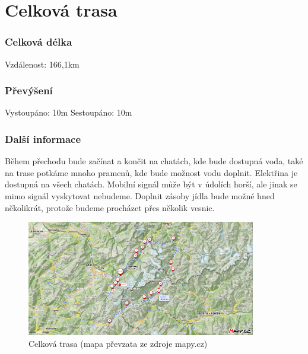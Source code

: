\section{Celková trasa}
\subsubsection*{Celková délka}
\noindent Vzdálenost: 166,1\:km
\subsubsection*{Převýšení}
\noindent Vystoupáno: 10\:m
\noindent Sestoupáno: 10\:m
\subsubsection*{Další informace}
Během přechodu bude začínat a končit na chatách, kde bude dostupná voda, také na trase potkáme mnoho pramenů, kde bude možnost vodu doplnit. Elektřina je dostupná na všech chatách. Mobilní signál může být v údolích horší, ale jinak se mimo signál vyskytovat nebudeme. Doplnit zásoby jídla bude možné hned několikrát, protože budeme procházet přes několik vesnic.
\begin{figure}[!hbt]
	\centering
	\includegraphics[width=10.0cm]{Figures/TMB.png}
	\caption[Trasa: Celková]{Celková trasa (mapa převzata ze zdroje mapy.cz)}
	\label{Obr:tmb}
\end{figure} 
